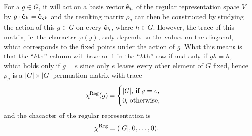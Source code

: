 For a $g \in G$, it will act on a basis vector $\mathbf{\hat{e}}_h$ of the regular representation space $V$ by $g \cdot \mathbf{\hat{e}}_{h} = \mathbf{\hat{e}}_{gh}$ and the resulting matrix $\rho_g$ can then be constructed by studying the action of this $g \in G$ on every $\mathbf{\hat{e}}_h$, where $h \in G$. However, the trace of this matrix, ie. the character $\varphi(g)$, only depends on the values on the diagonal, which corresponds to the fixed points under the action of $g$. What this means is that the ``$h$th'' column will have an 1 in the ``$h$th'' row if and only if $gh = h$, which holds only if $g = e$ since only $e$ leaves every other element of $G$ fixed, hence $\rho_g$ is a $|G| \times |G|$ permuation matrix with trace
\begin{align}\label{eq:regcharacter}
	\chi^{\text{Reg}}(g) = \begin{cases}
		|G| \text{, if $g = e$,} \\
		0 \text{, otherwise,}
	\end{cases}
\end{align}
and the chacacter of the regular representation is 
\begin{align*}
	\chi^{\text{Reg}} = (|G|, 0, \dots, 0).
\end{align*}

